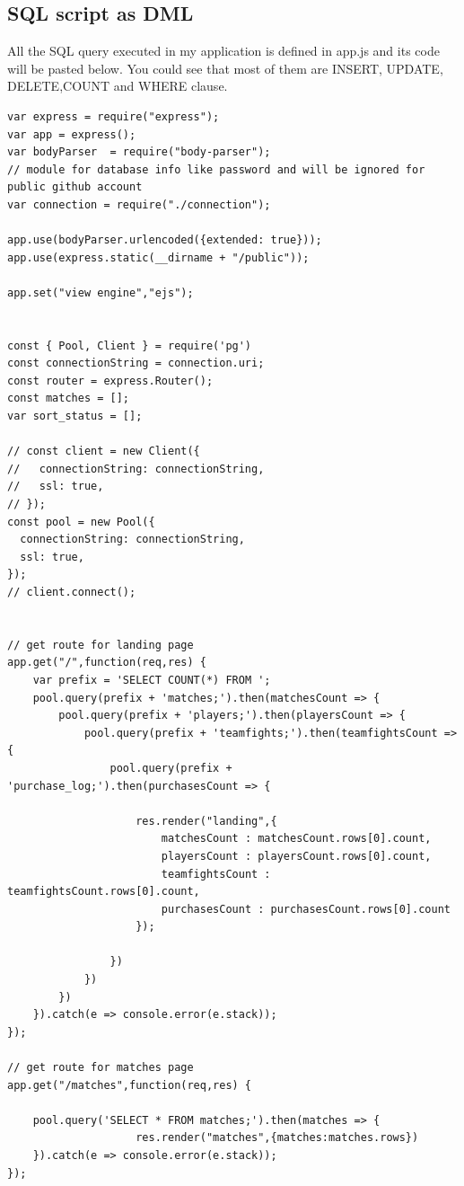 \documentclass[a4paper]{article}
\begin{document}
\subsection{SQL script as DML}
All the SQL query executed in my application is defined in app.js and its code will be pasted below. You could see that most of them are INSERT, UPDATE, DELETE,COUNT and WHERE clause.
\begin{lstlisting}
var express = require("express");
var app = express();
var bodyParser  = require("body-parser");
// module for database info like password and will be ignored for public github account
var connection = require("./connection");

app.use(bodyParser.urlencoded({extended: true}));
app.use(express.static(__dirname + "/public"));

app.set("view engine","ejs");


const { Pool, Client } = require('pg')
const connectionString = connection.uri;
const router = express.Router();
const matches = [];
var sort_status = [];

// const client = new Client({
//   connectionString: connectionString,
//   ssl: true,
// });
const pool = new Pool({
  connectionString: connectionString,
  ssl: true,
});
// client.connect();


// get route for landing page
app.get("/",function(req,res) {
    var prefix = 'SELECT COUNT(*) FROM ';
    pool.query(prefix + 'matches;').then(matchesCount => {
        pool.query(prefix + 'players;').then(playersCount => {
            pool.query(prefix + 'teamfights;').then(teamfightsCount => {
                pool.query(prefix + 'purchase_log;').then(purchasesCount => {
                    
                    res.render("landing",{
                        matchesCount : matchesCount.rows[0].count,
                        playersCount : playersCount.rows[0].count,
                        teamfightsCount : teamfightsCount.rows[0].count,
                        purchasesCount : purchasesCount.rows[0].count
                    });

                })
            })
        })
    }).catch(e => console.error(e.stack));
});

// get route for matches page
app.get("/matches",function(req,res) {

    pool.query('SELECT * FROM matches;').then(matches => {
                    res.render("matches",{matches:matches.rows})
    }).catch(e => console.error(e.stack));
});


\end{lstlisting}
\end{document}
